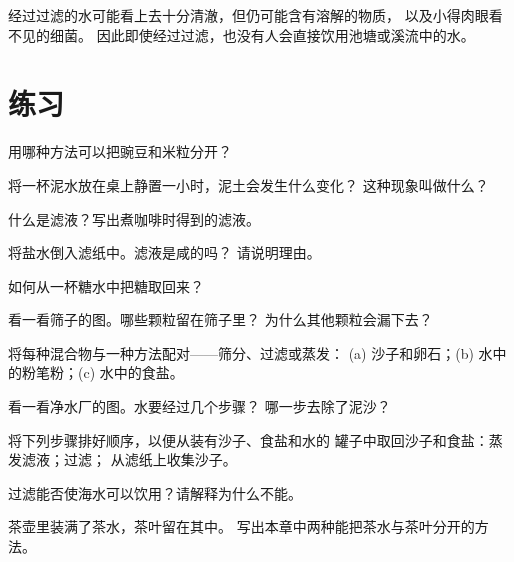 \begin{remark}[清澈不等于干净]\label{rem:g3:separating-mixtures:clean}
经过过滤的水可能看上去十分清澈，但仍可能含有溶解的物质，
以及小得肉眼看不见的细菌。
因此即使经过过滤，也没有人会直接饮用池塘或溪流中的水。
\end{remark}

\section{练习}

\begin{exercise}[$\star$]\label{exo:g3:separating-mixtures:1}
用哪种方法可以把豌豆和米粒分开？
\end{exercise}

\begin{exercise}[$\star$]\label{exo:g3:separating-mixtures:2}
将一杯泥水放在桌上静置一小时，泥土会发生什么变化？
这种现象叫做什么？
\end{exercise}

\begin{exercise}[$\star$]\label{exo:g3:separating-mixtures:3}
什么是滤液？写出煮咖啡时得到的滤液。
\end{exercise}

\begin{exercise}[$\star$]\label{exo:g3:separating-mixtures:4}
将盐水倒入滤纸中。滤液是咸的吗？
请说明理由。
\end{exercise}

\begin{exercise}[$\star$]\label{exo:g3:separating-mixtures:5}
如何从一杯糖水中把糖取回来？
\end{exercise}

\begin{exercise}[$\star$]\label{exo:g3:separating-mixtures:6}
看一看筛子的图。哪些颗粒留在筛子里？
为什么其他颗粒会漏下去？
\end{exercise}

\begin{exercise}[$\star$]\label{exo:g3:separating-mixtures:7}
将每种混合物与一种方法配对——筛分、过滤或蒸发：
(a) 沙子和卵石；(b) 水中的粉笔粉；(c) 水中的食盐。
\end{exercise}

\begin{exercise}[$\star$]\label{exo:g3:separating-mixtures:8}
看一看净水厂的图。水要经过几个步骤？
哪一步去除了泥沙？
\end{exercise}

\begin{exercise}[$\star$]\label{exo:g3:separating-mixtures:9}
将下列步骤排好顺序，以便从装有沙子、食盐和水的
罐子中取回沙子和食盐：蒸发滤液；过滤；
从滤纸上收集沙子。
\end{exercise}

\begin{exercise}[$\star\star$]\label{exo:g3:separating-mixtures:10}
过滤能否使海水可以饮用？请解释为什么不能。
\end{exercise}

\begin{exercise}[$\star\star$]\label{exo:g3:separating-mixtures:11}
茶壶里装满了茶水，茶叶留在其中。
写出本章中两种能把茶水与茶叶分开的方法。
\end{exercise}
